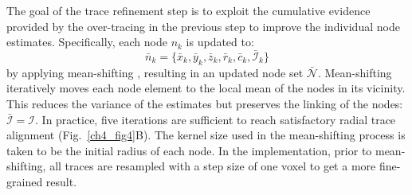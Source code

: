 The goal of the trace refinement step is to exploit the cumulative evidence provided by the over-tracing in the previous step to improve the individual node estimates. Specifically, each node $n_k$ is updated to:
\begin{equation}
\label{eq:bar_n_k}
\bar{n}_k = \lbrace \bar{x}_k, \bar{y}_k, \bar{z}_k, \bar{r}_k, \bar{c}_k, \bar{\mathcal{I}}_k \rbrace
\end{equation}
by applying mean-shifting \cite{cheng1995mean}, resulting in an updated node set $\bar{\mathcal{N}}$. Mean-shifting iteratively moves each node element to the local mean of the nodes in its vicinity. This reduces the variance of the estimates but preserves the linking of the nodes: $\bar{\mathcal{I}}=\mathcal{I}$. In practice, five iterations are sufficient to reach satisfactory radial trace alignment (Fig.~\ref{ch4_fig4}B). The kernel size used in the mean-shifting process is taken to be the initial radius of each node. In the implementation, prior to mean-shifting, all traces are resampled with a step size of one voxel to get a more fine-grained result.
